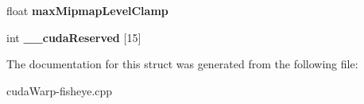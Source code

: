 \begin{DoxyCompactItemize}
\item 
float {\bfseries max\+Mipmap\+Level\+Clamp}\hypertarget{structtextureReference_a96d72337d70c83d450d74f7976cfc48c}{}\label{structtextureReference_a96d72337d70c83d450d74f7976cfc48c}

\item 
int {\bfseries \+\_\+\+\_\+cuda\+Reserved} \mbox{[}15\mbox{]}\hypertarget{structtextureReference_a7dc33bfb3fe85912e6366e23ac891e7d}{}\label{structtextureReference_a7dc33bfb3fe85912e6366e23ac891e7d}

\end{DoxyCompactItemize}


The documentation for this struct was generated from the following file\+:\begin{DoxyCompactItemize}
\item 
cuda\+Warp-\/fisheye.\+cpp\end{DoxyCompactItemize}

